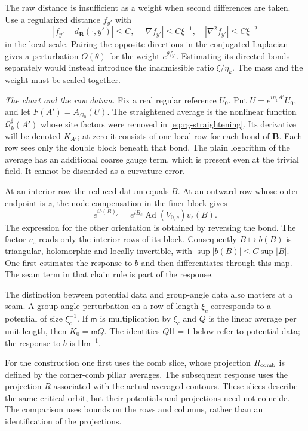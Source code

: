 \documentclass[11pt,letterpaper,reqno]{amsart}
\theoremstyle{definition}
\theoremstyle{remark}
\begin{document}
The raw distance is insufficient as a weight when second
differences are taken. Use a regularized distance $f_{y'}$ with
\[
 |f_{y'}-d_{\mathbf B}(\cdot,y')|\le C,\quad
 |\nabla f_{y'}|\le C\xi^{-1},\quad
 |\nabla^2f_{y'}|\le C\xi^{-2}
\]
in the local scale. Pairing the opposite directions in the
conjugated Laplacian gives a perturbation $O(\theta)$ for
the weight $e^{\theta f_{y'}}$. Estimating its directed bonds
separately would instead introduce the inadmissible ratio
$\xi/\eta_k$. The mass and the weight must be scaled together.

\emph{The chart and the row datum.}
Fix a real regular reference $U_0$. Put
$U=e^{i\eta_kA'}U_0$, and let $F(A')=A_{\Omega_0}(U)$.
The straightened average is the nonlinear function
$\mathcal Q_k^\sharp(A')$ whose site factors were removed in
\eqref{eq:rg-straightening}. Its derivative will be denoted
$K_{A'}$; at zero it consists of one local row for each bond
of $\mathbf B$. Each row sees only the double block beneath
that bond. The plain logarithm of the average has an additional
coarse gauge term, which is present even at the trivial field.
It cannot be discarded as a curvature error.

At an interior row the reduced datum equals $B$. At an outward
row whose outer endpoint is $z$, the node compensation in the
finer block gives
\begin{equation}\label{eq:mrg-reduced-datum}
 e^{ib(B)_c}=e^{iB_c}\operatorname{Ad}(V_{0,c})v_z(B).
\end{equation}
The expression for the other orientation is obtained by reversing
the bond. The factor $v_z$ reads only the interior rows of its
block. Consequently $B\mapsto b(B)$ is triangular, holomorphic
and locally invertible, with $\sup|b(B)|\le C\sup|B|$.
One first estimates the response to $b$ and then differentiates
through this map. The seam term in that chain rule is part of
the response.

The distinction between potential data and group-angle data also
matters at a seam. A group-angle perturbation on a row of length
$\xi_c$ corresponds to a potential of size $\xi_c^{-1}$.
If $\mathsf m$ is multiplication by $\xi_c$ and $Q$ is the
linear average per unit length, then $K_0=\mathsf mQ$.
The identities $Q\mathsf H=1$ below refer to potential data;
the response to $b$ is $\mathsf H\mathsf m^{-1}$.

For the construction one first uses the comb slice, whose
projection $R_{\rm comb}$ is defined by the corner-comb pillar
averages. The subsequent response uses the projection $R$
associated with the actual averaged contours. These slices
describe the same critical orbit, but their potentials and
projections need not coincide. The comparison uses bounds on
the rows and columns, rather than an identification of the
projections.
\end{document}
